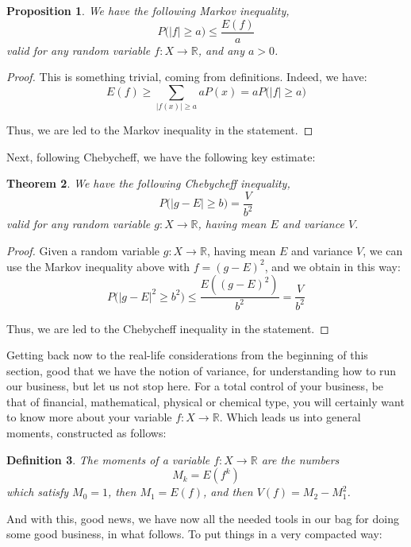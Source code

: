 \documentclass[12pt]{amsbook}
\newtheorem{theorem}{Theorem}[chapter]
\newtheorem{definition}[theorem]{Definition}
\newtheorem{proposition}[theorem]{Proposition}
\begin{document}

\begin{proposition}
We have the following Markov inequality,
$$P\big(|f|\geq a\big)\leq\frac{E(f)}{a}$$
valid for any random variable $f:X\to\mathbb R$, and any $a>0$.
\end{proposition}

\begin{proof}
This is something trivial, coming from definitions. Indeed, we have:
$$E(f)
\geq\sum_{|f(x)|\geq a}aP(x)
=aP\big(|f|\geq a\big)$$

Thus, we are led to the Markov inequality in the statement.
\end{proof}

Next, following Chebycheff, we have the following key estimate:


\begin{theorem}
We have the following Chebycheff inequality,
$$P\big(|g-E|\geq b\big)=\frac{V}{b^2}$$
valid for any random variable $g:X\to\mathbb R$, having mean $E$ and variance $V$.
\end{theorem}

\begin{proof}
Given a random variable $g:X\to\mathbb R$, having mean $E$ and variance $V$, we can use the Markov inequality above with $f=(g-E)^2$, and we obtain in this way:
$$P\big(|g-E|^2\geq b^2\big)
\leq\frac{E((g-E)^2)}{b^2}
=\frac{V}{b^2}$$

Thus, we are led to the Chebycheff inequality in the statement.
\end{proof}

Getting back now to the real-life considerations from the beginning of this section, good that we have the notion of variance, for understanding how to run our business, but let us not stop here. For a total control of your business, be that of financial, mathematical, physical or chemical type, you will certainly want to know more about your variable $f:X\to\mathbb R$. Which leads us into general moments, constructed as follows:


\begin{definition}
The moments of a variable $f:X\to\mathbb R$ are the numbers
$$M_k=E(f^k)$$
which satisfy $M_0=1$, then $M_1=E(f)$, and then $V(f)=M_2-M_1^2$.
\end{definition}

And with this, good news, we have now all the needed tools in our bag for doing some good business, in what follows. To put things in a very compacted way:
\end{document}

